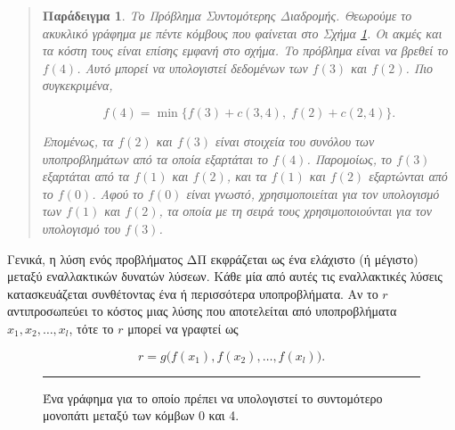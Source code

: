 \documentclass[12pt,a4paper]{article}
\newtheorem{paradeigma}{Παράδειγμα}
\begin{document}
\begin{quote}
\begin{paradeigma} \label{par:2} Το Πρόβλημα Συντομότερης Διαδρομής.
Θεωρούμε το ακυκλικό γράφημα με πέντε κόμβους που φαίνεται στο Σχήμα \ref{fig:graph23}. Οι ακμές και τα κόστη τους είναι επίσης εμφανή στο σχήμα.
Το πρόβλημα είναι να βρεθεί το $f(4)$. Αυτό μπορεί να υπολογιστεί δεδομένων των $f(3)$ και $f(2)$.
Πιο συγκεκριμένα,

\[
f(4) = \min \{ f(3) + c(3,4), \; f(2) + c(2,4) \}.
\]

Επομένως, τα $f(2)$ και $f(3)$ είναι στοιχεία του συνόλου των υποπροβλημάτων
από τα οποία εξαρτάται το $f(4)$. Παρομοίως, το $f(3)$ εξαρτάται από τα $f(1)$ και $f(2)$,
και τα $f(1)$ και $f(2)$ εξαρτώνται από το $f(0)$. Αφού το $f(0)$ είναι γνωστό, χρησιμοποιείται για τον υπολογισμό των $f(1)$ και $f(2)$, 
τα οποία με τη σειρά τους χρησιμοποιούνται για τον υπολογισμό του $f(3)$.
\end{paradeigma}
\end{quote}

\par\vspace{0.3cm}
Γενικά, η λύση ενός προβλήματος ΔΠ εκφράζεται ως ένα ελάχιστο 
(ή μέγιστο) μεταξύ εναλλακτικών δυνατών λύσεων. Κάθε μία από αυτές τις εναλλακτικές λύσεις 
κατασκευάζεται συνθέτοντας ένα ή περισσότερα υποπροβλήματα. Αν το $r$ αντιπροσωπεύει το κόστος 
μιας λύσης που αποτελείται από υποπροβλήματα $x_1, x_2, \ldots, x_l$, τότε το $r$ μπορεί να 
γραφτεί ως

\[
r = g\bigl(f(x_1), f(x_2), \ldots, f(x_l)\bigr).
\]

\begin{figure}[H]
\centering
{}
\noindent\rule{\textwidth}{0.2pt}
\caption{Ένα γράφημα για το οποίο πρέπει να υπολογιστεί το συντομότερο μονοπάτι μεταξύ των κόμβων 0 και 4.}
\label{fig:graph23}
\end{figure}
\end{document}
